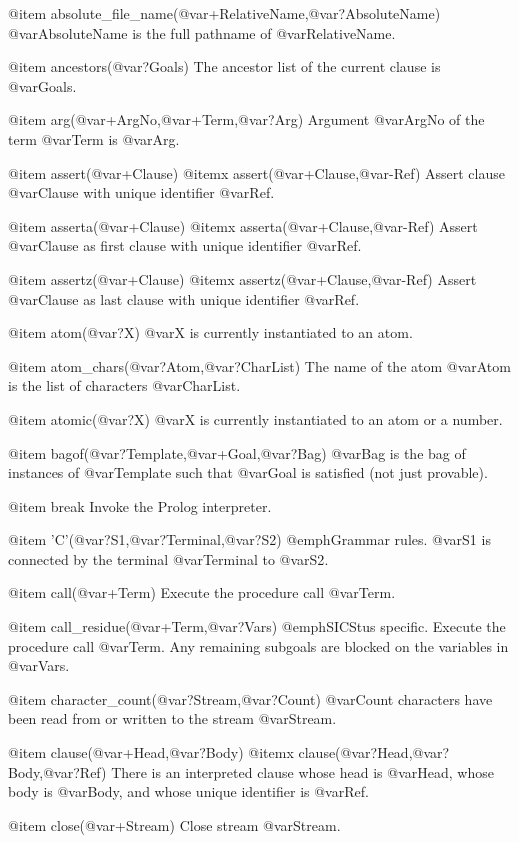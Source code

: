 {{{{{@item absolute_file_name(@var{+RelativeName},@var{?AbsoluteName})
@var{AbsoluteName} is the full pathname of @var{RelativeName}.

@item ancestors(@var{?Goals})
The ancestor list of the current clause is @var{Goals}.

@item arg(@var{+ArgNo},@var{+Term},@var{?Arg})
Argument @var{ArgNo} of the term @var{Term} is @var{Arg}.

@item assert(@var{+Clause})
@itemx assert(@var{+Clause},@var{-Ref})
Assert clause @var{Clause} with unique identifier @var{Ref}.

@item asserta(@var{+Clause})
@itemx asserta(@var{+Clause},@var{-Ref})
Assert @var{Clause} as first clause with unique identifier @var{Ref}.

@item assertz(@var{+Clause})
@itemx assertz(@var{+Clause},@var{-Ref})
Assert @var{Clause} as last clause with unique identifier @var{Ref}.

@item atom(@var{?X})
@var{X} is currently instantiated to an atom.

@item atom_chars(@var{?Atom},@var{?CharList})
The name of the atom @var{Atom} is the list of characters @var{CharList}.

@item atomic(@var{?X})
@var{X} is currently instantiated to an atom or a number.

@item bagof(@var{?Template},@var{+Goal},@var{?Bag})
@var{Bag} is the bag of instances of @var{Template} such that @var{Goal}
is satisfied (not just provable).

@item break
Invoke the Prolog interpreter.

@item 'C'(@var{?S1},@var{?Terminal},@var{?S2})
@emph{Grammar rules.} @var{S1} is connected by the terminal
@var{Terminal} to @var{S2}.

@item call(@var{+Term})
Execute the procedure call @var{Term}.

@item call_residue(@var{+Term},@var{?Vars})
@emph{SICStus specific.} Execute the procedure call @var{Term}.  Any
remaining subgoals are blocked on the variables in @var{Vars}.

@item character_count(@var{?Stream},@var{?Count})
@var{Count} characters have been read from or written to the stream
@var{Stream}.

@item clause(@var{+Head},@var{?Body})
@itemx clause(@var{?Head},@var{?Body},@var{?Ref})
There is an interpreted clause whose head is @var{Head}, whose body is
@var{Body}, and whose unique identifier is @var{Ref}.

@item close(@var{+Stream})
Close stream @var{Stream}.

}}}}}
